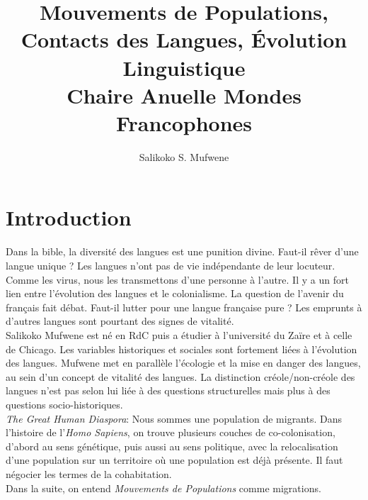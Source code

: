 \documentclass{cours}
\title{Mouvements de Populations, Contacts des Langues, Évolution Linguistique\\ \small Chaire Anuelle Mondes Francophones}
\author{Salikoko S. Mufwene}
\begin{document}
\section*{Introduction}
Dans la bible, la diversité des langues est une punition divine. Faut-il rêver d'une langue unique ? \og Les langues n'ont pas de vie indépendante de leur locuteur. Comme les virus, nous les transmettons d'une personne à l'autre. \fg
Il y a un fort lien entre l'évolution des langues et le colonialisme.
La question de l'avenir du français fait débat. Faut-il lutter pour une langue française pure ? Les emprunts à d'autres langues sont pourtant des signes de vitalité.\\
Salikoko Mufwene est né en RdC puis a étudier à l'université du Zaïre et à celle de Chicago. Les variables historiques et sociales sont fortement liées à l'évolution des langues.
Mufwene met en parallèle l'écologie et la mise en danger des langues, au sein d'un concept de vitalité des langues.
La distinction créole/non-créole des langues n'est pas selon lui liée à des questions structurelles mais plus à des questions socio-historiques. \\
\textit{The Great Human Diaspora}: Nous sommes une population de migrants. Dans l'histoire de l'\textit{Homo Sapiens}, on trouve plusieurs couches de co-colonisation, d'abord au sens génétique, puis aussi au sens politique, avec la relocalisation d'une population sur un territoire où une population est déjà présente. 
Il faut négocier les termes de la cohabitation.\\
Dans la suite, on entend \textit{Mouvements de Populations} comme migrations. 
\end{document}
